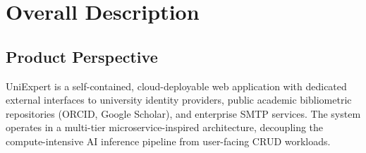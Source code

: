 \documentclass[11pt,a4paper]{article}
\begin{document}
\clearpage
\section{Overall Description}
\label{sec:overall_desc}

\subsection{Product Perspective}
UniExpert is a self-contained, cloud-deployable web application with dedicated external interfaces to university identity providers, public academic bibliometric repositories (ORCID, Google Scholar), and enterprise SMTP services. The system operates in a multi-tier microservice-inspired architecture, decoupling the compute-intensive AI inference pipeline from user-facing CRUD workloads.
\end{document}
